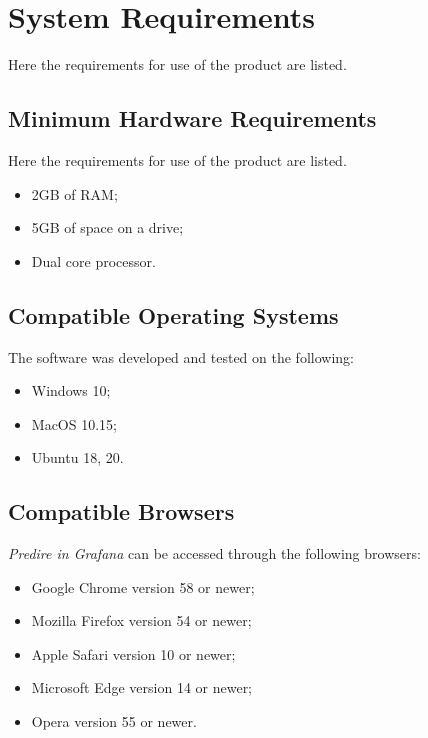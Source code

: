 \section{System Requirements}
Here the requirements for use of the product are listed.

\subsection{Minimum Hardware Requirements}
Here the requirements for use of the product are listed.
\begin{itemize}
	\item 2GB of RAM;
	\item 5GB of space on a drive;
	\item Dual core processor.	
\end{itemize}

\subsection{Compatible Operating Systems}
The software was developed and tested on the following:
\begin{itemize}
	\item Windows 10;
	\item MacOS 10.15;
	\item Ubuntu 18, 20.
\end{itemize}

\subsection{Compatible Browsers}
\textit{Predire in Grafana} can be accessed through the following browsers:
\begin{itemize}
	\item Google Chrome version 58 or newer;
	\item Mozilla Firefox version 54 or newer;
	\item Apple Safari version 10 or newer;
	\item Microsoft Edge version 14 or newer;
	\item Opera version 55 or newer.
\end{itemize}



